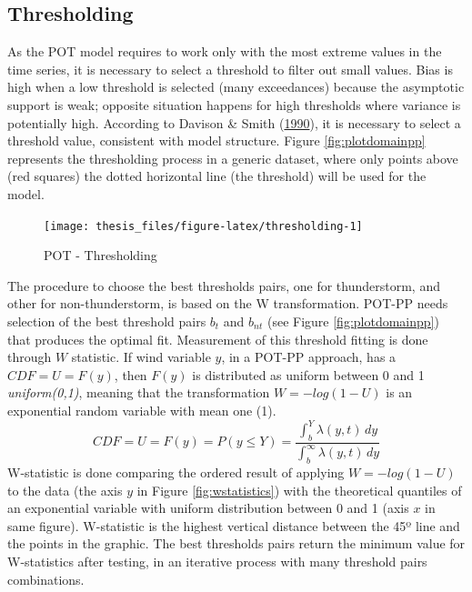 \documentclass[12pt,oneside]{reedthesis}
\begin{document}
\hypertarget{thresholding}{%
\subsection{Thresholding}\label{thresholding}}

As the POT model requires to work only with the most extreme values in the time series, it is necessary to select a threshold to filter out small values. Bias is high when a low threshold is selected (many exceedances) because the asymptotic support is weak; opposite situation happens for high thresholds where variance is potentially high. According to Davison \& Smith (\protect\hyperlink{ref-Davison1990}{1990}), it is necessary to select a threshold value, consistent with model structure. Figure \ref{fig:plotdomainpp} represents the thresholding process in a generic dataset, where only points above (red squares) the dotted horizontal line (the threshold) will be used for the model.

\footnotesize
\begin{figure}

{\centering \texttt{[image: thesis\_files/figure-latex/thresholding-1]} 

}

\caption{POT - Thresholding}\label{fig:thresholding}
\end{figure}
\normalsize

The procedure to choose the best thresholds pairs, one for thunderstorm, and other for non-thunderstorm, is based on the W transformation. POT-PP needs selection of the best threshold pairs \(b_t\) and \(b_{nt}\) (see Figure \ref{fig:plotdomainpp}) that produces the optimal fit. Measurement of this threshold fitting is done through \(W\) statistic. If wind variable \(y\), in a POT-PP approach, has a \(CDF = U = F(y)\), then \(F(y)\) is distributed as uniform between 0 and 1 \emph{uniform(0,1)}, meaning that the transformation \(W = -log(1-U)\) is an exponential random variable with mean one (1).
\begin{equation}
            CDF = U= F(y) = P(y \leq Y) = \frac{\int_b^Y\lambda(y,t)\,dy}{\int_b^\infty\lambda(y,t)\,dy} 
  \label{eq:ppcdf}
\end{equation}
W-statistic is done comparing the ordered result of applying \(W = -log(1-U)\) to the data (the axis \(y\) in Figure \ref{fig:wstatistics}) with the theoretical quantiles of an exponential variable with uniform distribution between 0 and 1 (axis \(x\) in same figure). W-statistic is the highest vertical distance between the 45º line and the points in the graphic. The best thresholds pairs return the minimum value for W-statistics after testing, in an iterative process with many threshold pairs combinations.
\end{document}

